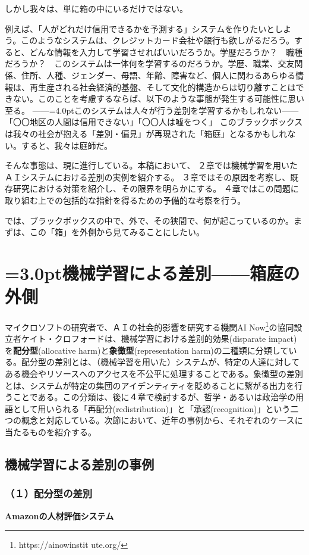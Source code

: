 \documentclass[b5j,twoside,twocolumn]{utarticle}
\newcommand{\mysection}[1]{\vspace{-5mm}\section{#1}\vspace{-2mm}}
\newcommand{\mysubsection}[1]{\vspace{-6mm}\subsection{#1}\vspace{-2mm}}
\begin{document}
しかし我々は、単に箱の中にいるだけではない。


例えば、「人がどれだけ信用できるかを予測する」システムを作りたいとしよう。このようなシステムは、クレジットカード会社や銀行も欲しがるだろう。すると、どんな情報を入力して学習させればいいだろうか。学歴だろうか？　職種だろうか？　このシステムは一体何を学習するのだろうか。学歴、職業、交友関係、住所、人種、ジェンダー、母語、年齢、障害など、個人に関わるあらゆる情報は、再生産される社会経済的基盤、そして文化的構造からは切り離すことはできない。このことを考慮するならば、以下のような事態が発生する可能性に思い至る。
\tbaselineshift=2.5pt------\tbaselineshift=4.0ptこのシステムは人々が行う差別を学習するかもしれない\tbaselineshift=2.5pt------\tbaselineshift=4.0pt「〇〇地区の人間は信用できない」「〇〇人は嘘をつく」
このブラックボックスは我々の社会が抱える「差別・偏見」が再現された「箱庭」となるかもしれない。すると、我々は庭師だ。


そんな事態は、現に進行している。本稿において、
２章では機械学習を用いたＡＩシステムにおける差別の実例を紹介する。
３章ではその原因を考察し、既存研究における対策を紹介し、その限界を明らかにする。
４章ではこの問題に取り組む上での包括的な指針を得るための予備的な考察を行う。


では、ブラックボックスの中で、外で、その狭間で、何が起こっているのか。まずは、この「箱」を\.外\.側から見てみることにしたい。



\mysection{\tbaselineshift=3.0pt機械学習による差別------箱庭の外側}
マイクロソフトの研究者で、ＡＩの社会的影響を研究する機関AI Now\footnote{https://ainowinstit ute.org/}の協同設立者ケイト・クロフォードは、機械学習における差別的効果(disparate impact)を\textbf{配分型}(allocative  harm)と\textbf{象徴型}(representation harm)の二種類に分類している\cite{kate}。配分型の差別とは、（機械学習を用いた）システムが、特定の人達に対してある機会やリソースへのアクセスを不公平に処理することである。象徴型の差別とは、システムが特定の集団のアイデンティティを貶めることに繋がる出力を行うことである。この分類は、後に４章で検討するが、哲学・あるいは政治学の用語として用いられる「再配分(redistribution)」と「承認(recognition)」という二つの概念と対応している。次節において、近年の事例から、それぞれのケースに当たるものを紹介する。



\mysubsection{機械学習による差別の事例}
\subsubsection*{（１）配分型の差別}
\noindent\textbf{Amazonの人材評価システム}
\end{document}
